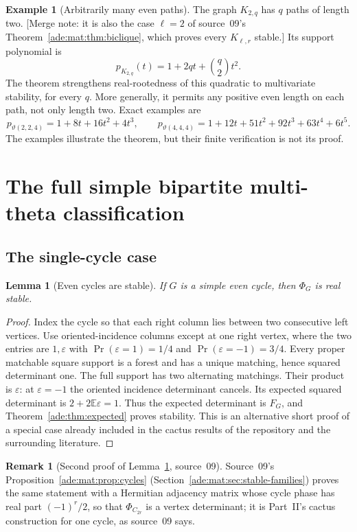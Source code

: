 \documentclass[11pt]{article}
\numberwithin{equation}{section}
\newtheorem{lemma}[theorem]{Lemma}
\theoremstyle{definition}
\newtheorem{remark}[theorem]{Remark}
\newtheorem{example}[theorem]{Example}%
\newcommand{\EE}{\mathbb E}
\newcommand{\ep}{\varepsilon}
\begin{document}
\begin{example}[Arbitrarily many even paths]
The graph $K_{2,q}$ has $q$ paths of length two. [Merge note: it is also the case $\ell=2$ of source~09's Theorem~\ref{ade:mat:thm:biclique}, which proves every $K_{\ell,r}$ stable.]  Its support polynomial is
\[
 p_{K_{2,q}}(t)=1+2qt+\binom q2t^2.
\]
The theorem strengthens real-rootedness of this quadratic to multivariate
stability, for every $q$.  More generally, it permits any positive even
length on each path, not only length two.  Exact examples are
\[
 p_{\vartheta(2,2,4)}=1+8t+16t^2+4t^3,
 \qquad
 p_{\vartheta(4,4,4)}=1+12t+51t^2+92t^3+63t^4+6t^5.
\]
The examples illustrate the theorem, but their finite verification is not
its proof.
\end{example}

\section{The full simple bipartite multi-theta classification}
\label{ade:sec:theta}

\subsection{The single-cycle case}

\begin{lemma}[Even cycles are stable]
\label{ade:lem:cycle}
If $G$ is a simple even cycle, then $\Phi_G$ is real stable.
\end{lemma}
\begin{proof}
Index the cycle so that each right column lies between two consecutive
left vertices.  Use oriented-incidence columns except at one right
vertex, where the two entries are $1,\ep$ with
$\Pr(\ep=1)=1/4$ and $\Pr(\ep=-1)=3/4$.
Every proper matchable square support is a forest and has a unique
matching, hence squared determinant one.  The full support has two
alternating matchings.  Their product is $\ep$: at $\ep=-1$ the oriented
incidence determinant cancels.  Its expected squared determinant is
$2+2\EE\ep=1$.
Thus the expected determinant is $F_G$, and
Theorem~\ref{ade:thm:expected} proves stability.  This is an alternative
short proof of a special case already included in the cactus results
of the repository and the surrounding literature.
\end{proof}

\begin{remark}[Second proof of Lemma~\ref{ade:lem:cycle}, source~09]
Source~09's Proposition~\ref{ade:mat:prop:cycles} (Section~\ref{ade:mat:sec:stable-families})
proves the same statement with a Hermitian adjacency matrix whose cycle phase
has real part $(-1)^r/2$, so that $\Phi_{C_{2r}}$ is a vertex determinant;
it is Part~II's cactus construction for one cycle, as source~09 says.
\end{remark}
\end{document}
